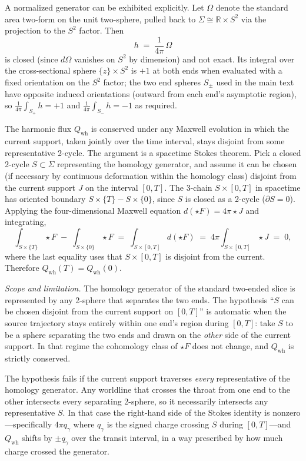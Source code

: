 \documentclass[aps,prd,onecolumn,nofootinbib,superscriptaddress]{revtex4-2}
\begin{document}
A normalized generator can be exhibited explicitly. Let $\Omega$ denote the standard area two-form on the unit two-sphere, pulled back to $\Sigma \cong \mathbb{R}\times S^2$ via the projection to the $S^2$ factor. Then
\begin{equation}
h \;=\; \frac{1}{4\pi}\,\Omega
\end{equation}
is closed (since $d\Omega$ vanishes on $S^2$ by dimension) and not exact. Its integral over the cross-sectional sphere $\{z\}\times S^2$ is $+1$ at both ends when evaluated with a fixed orientation on the $S^2$ factor; the two end spheres $S_\pm$ used in the main text have opposite induced orientations (outward from each end's asymptotic region), so $\frac{1}{4\pi}\int_{S_+} h = +1$ and $\frac{1}{4\pi}\int_{S_-} h = -1$ as required.

The harmonic flux $Q_{\mathrm{wh}}$ is conserved under any Maxwell evolution in which the current support, taken jointly over the time interval, stays disjoint from some representative 2-cycle. The argument is a spacetime Stokes theorem. Pick a closed 2-cycle $S \subset \Sigma$ representing the homology generator, and assume it can be chosen (if necessary by continuous deformation within the homology class) disjoint from the current support $J$ on the interval $[0,T]$. The 3-chain $S\times[0,T]$ in spacetime has oriented boundary $S\times\{T\} - S\times\{0\}$, since $S$ is closed as a 2-cycle ($\partial S = 0$). Applying the four-dimensional Maxwell equation $d(\star F) = 4\pi \star J$ and integrating,
\begin{equation}
\int_{S\times\{T\}} \star F \;-\; \int_{S\times\{0\}} \star F \;=\; \int_{S\times[0,T]} d(\star F) \;=\; 4\pi\int_{S\times[0,T]} \star J \;=\; 0,
\end{equation}
where the last equality uses that $S\times[0,T]$ is disjoint from the current. Therefore $Q_{\mathrm{wh}}(T) = Q_{\mathrm{wh}}(0)$.

\emph{Scope and limitation.} The homology generator of the standard two-ended slice is represented by any 2-sphere that separates the two ends. The hypothesis ``$S$ can be chosen disjoint from the current support on $[0,T]$'' is automatic when the source trajectory stays entirely within one end's region during $[0,T]$: take $S$ to be a sphere separating the two ends and drawn on the \emph{other} side of the current support. In that regime the cohomology class of $\star F$ does not change, and $Q_{\mathrm{wh}}$ is strictly conserved.

The hypothesis fails if the current support traverses \emph{every} representative of the homology generator. Any worldline that crosses the throat from one end to the other intersects every separating 2-sphere, so it necessarily intersects any representative $S$. In that case the right-hand side of the Stokes identity is nonzero---specifically $4\pi q_\gamma$ where $q_\gamma$ is the signed charge crossing $S$ during $[0,T]$---and $Q_{\mathrm{wh}}$ shifts by $\pm q_\gamma$ over the transit interval, in a way prescribed by how much charge crossed the generator.
\end{document}
